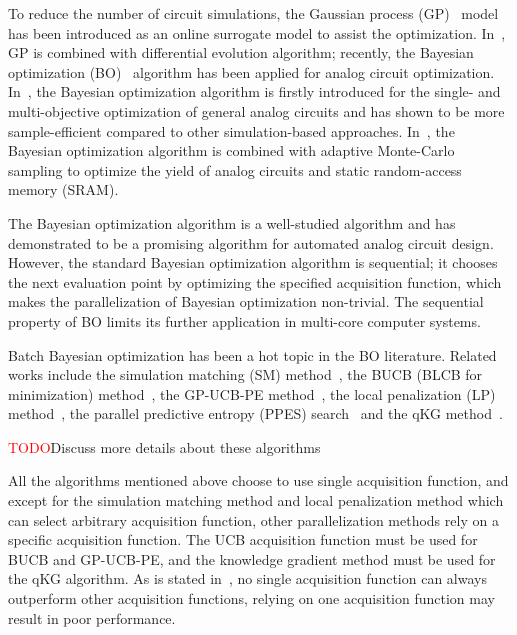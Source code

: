 %
To reduce the number of circuit simulations, the Gaussian process
(GP)~\cite{GPML} model has been introduced as an online surrogate model to
assist the optimization. In~\cite{liu2014gaspad}, GP is combined with
differential evolution algorithm; recently, the
Bayesian optimization (BO)~\cite{shahriari2016taking} algorithm has been
applied for analog circuit optimization. In~\cite{lyu2017efficient}, the Bayesian optimization algorithm is
firstly introduced for the single- and multi-objective optimization of general analog circuits and has
shown to be more sample-efficient compared to other simulation-based
approaches. In~\cite{wang2017efficient}, the Bayesian optimization algorithm
is combined with adaptive Monte-Carlo sampling to optimize the yield of analog
circuits and static random-access memory (SRAM).

The Bayesian optimization algorithm is a well-studied algorithm and has
demonstrated to be a promising algorithm for automated analog circuit design.
However, the standard Bayesian optimization algorithm is sequential; it chooses
the next evaluation point by optimizing the specified acquisition function,
which makes the parallelization of Bayesian optimization non-trivial. The
sequential property of BO limits its further application in multi-core computer
systems.

Batch Bayesian optimization has been a hot topic in the BO literature.
Related works include the simulation matching (SM)
method~\cite{azimi2010batch}, the BUCB (BLCB for minimization)
method~\cite{desautels2014parallelizing}, the GP-UCB-PE
method~\cite{contal2013parallel}, the local penalization (LP)
method~\cite{gonzalez2016batch}, the parallel predictive entropy (PPES)
search~\cite{shah2015parallel} and the qKG method~\cite{wu2016parallel}.

\textcolor{red}{TODO}{Discuss more details about these algorithms}


All the algorithms mentioned above choose to use single acquisition function,
and except for the simulation matching method and local penalization method
which can select arbitrary acquisition function, other parallelization methods
rely on a specific acquisition function. The UCB acquisition function must be
used for BUCB and GP-UCB-PE, and the knowledge gradient method must be used for
the qKG algorithm. As is stated in~\cite{hoffman2011portfolio}, no single
acquisition function can always outperform other acquisition functions, relying
on one acquisition function may result in poor performance. 

